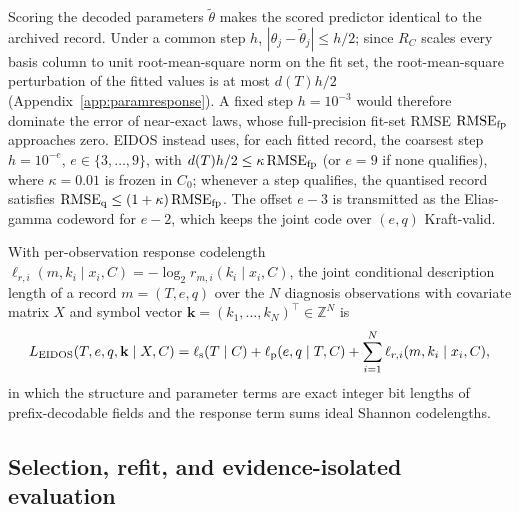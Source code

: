 \begin{remark}\label{rem:quantisation}
Scoring the decoded parameters \(\widetilde\theta\) makes the scored predictor identical to the archived record. Under a common step \(h\), \(|\theta_j-\widetilde\theta_j|\le h/2\); since \(R_C\) scales every basis column to unit root-mean-square norm on the fit set, the root-mean-square perturbation of the fitted values is at most \(d(T)h/2\) (Appendix~\ref{app:paramresponse}). A fixed step \(h=10^{-3}\) would therefore dominate the error of near-exact laws, whose full-precision fit-set RMSE \(\mathrm{RMSE}_{\rm fp}\) approaches zero. EIDOS instead uses, for each fitted record, the coarsest step \(h=10^{-e}\), \(e\in\{3,\ldots,9\}\), with \(d(T)h/2\le\kappa\,\mathrm{RMSE}_{\rm fp}\) (or \(e=9\) if none qualifies), where \(\kappa=0.01\) is frozen in \(C_0\); whenever a step qualifies, the quantised record satisfies \(\mathrm{RMSE}_{\rm q}\le(1+\kappa)\,\mathrm{RMSE}_{\rm fp}\). The offset \(e-3\) is transmitted as the Elias-gamma codeword for \(e-2\), which keeps the joint code over \((e,q)\) Kraft-valid.
\end{remark}

With per-observation response codelength \(\ell_{r,i}(m,k_i\mid x_i,C)=-\log_2 r_{m,i}(k_i\mid x_i,C)\), the joint conditional description length of a record \(m=(T,e,q)\) over the \(N\) diagnosis observations with covariate matrix \(X\) and symbol vector \(\mathbf k=(k_1,\ldots,k_N)^\top\in\mathbb Z^N\) is
\begin{equation}\label{eq:eidoscode}
L_{\mathrm{EIDOS}}(T,e,q,\mathbf k\mid X,C)=\ell_{\rm s}(T\mid C)+\ell_{\rm p}(e,q\mid T,C)+\sum_{i=1}^{N}\ell_{r,i}(m,k_i\mid x_i,C),
\end{equation}
in which the structure and parameter terms are exact integer bit lengths of prefix-decodable fields and the response term sums ideal Shannon codelengths.

\subsection{Selection, refit, and evidence-isolated evaluation}\label{sec:isolation}

